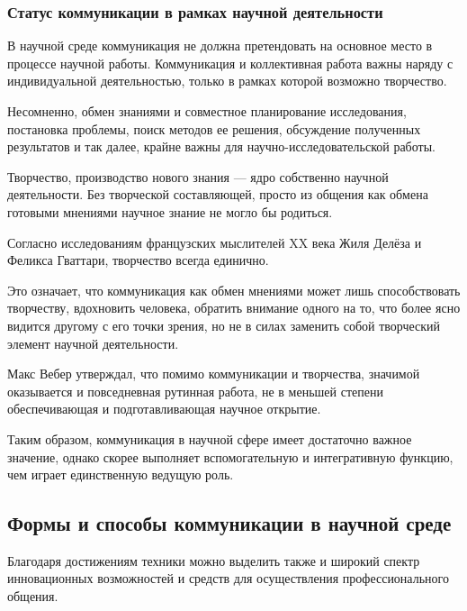 \subsubsection{Статус коммуникации в рамках научной деятельности}

В научной среде коммуникация не должна претендовать на основное место в процессе научной работы. Коммуникация и коллективная работа важны наряду с индивидуальной
деятельностью, только в рамках которой возможно творчество. 

Несомненно, обмен
знаниями и совместное планирование исследования, постановка проблемы, поиск
методов ее решения, обсуждение полученных результатов и так далее, крайне важны
для научно-исследовательской работы.

Творчество, производство нового знания — ядро собственно научной деятельности.
Без творческой составляющей, просто из общения как обмена готовыми мнениями научное знание не
могло бы родиться. 

Согласно исследованиям французских мыслителей
XX века Жиля Делёза и Феликса Гваттари, творчество всегда единично. 

Это означает, что
коммуникация как обмен мнениями может лишь способствовать творчеству, вдохновить
человека, обратить внимание одного на то, что более ясно видится другому с его
точки зрения, но не в силах заменить собой творческий элемент научной
деятельности. 

Макс Вебер утверждал, что помимо коммуникации и творчества,
значимой оказывается и повседневная рутинная работа, не в меньшей
степени обеспечивающая и подготавливающая научное открытие.

Таким образом, коммуникация в научной сфере имеет
достаточно важное значение, однако скорее выполняет вспомогательную и
интегративную функцию, чем играет единственную ведущую роль.


\subsection{Формы и способы коммуникации в научной среде}

Благодаря достижениям техники можно
выделить также и широкий спектр инновационных
возможностей и средств для осуществления профессионального общения.

